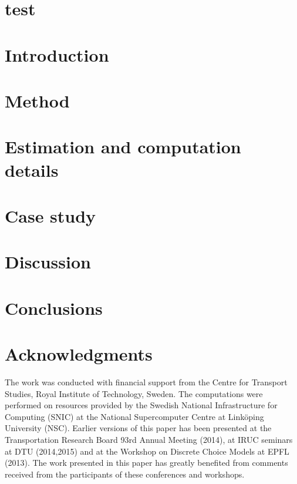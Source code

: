 \documentclass[final,pdftex]{Oskarthesis}
\numberwithin{equation}{section}
\begin{document}
\section{test}

\section{Introduction}

\section{Method}\label{seq:model}

\section{Estimation and computation details}

\section{Case study}

\FloatBarrier

\section{Discussion}

\section{Conclusions}


\section*{Acknowledgments}
The work was conducted with financial support from the Centre for Transport Studies, Royal Institute of Technology, Sweden. The computations were performed on resources provided by the Swedish National Infrastructure for Computing (SNIC) at the National Supercomputer Centre at Link\"oping University (NSC). Earlier versions of this paper has been presented at the Transportation Research Board 93rd Annual Meeting (2014), at IRUC seminars at DTU (2014,2015) and at the Workshop on Discrete Choice Models at EPFL (2013). The work presented in this paper has greatly benefited from comments received from the participants of these conferences and workshops.

\footnotesize


%

%
\end{document}
